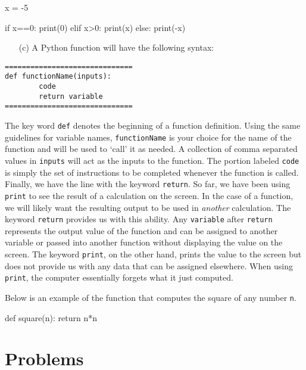 \documentclass{ximera}
\begin{document}
\begin{sageCell}
x = -5
	
if x==0:
        print(0)
elif x>0:
        print(x)
else:
        print(-x)
\end{sageCell}

	\begin{enumerate}
        	\item[(c)] A Python function will have the following syntax:
	\end{enumerate}

\begin{verbatim}
==============================
def functionName(inputs):
        code
        return variable
==============================
\end{verbatim}

The key word \verb|def| denotes the beginning of a function definition. Using the same guidelines for variable names, \verb|functionName| is your choice for the name of the function and will be used to `call' it as needed. A collection of comma separated values in \verb|inputs| will act as the inputs to the function.  The portion labeled \verb|code| is simply the set of instructions to be completed whenever the function is called. Finally, we have the line with the keyword \verb|return|. So far, we have been using \verb|print| to see the result of a calculation on the screen. In the case of a function, we will likely want the resulting output to be used in {\em another} calculation. The keyword \verb|return| provides us with this ability. Any \verb|variable| after \verb|return| represents the output value of the function and can be assigned to another variable or passed into another function without displaying the value on the screen. The keyword \verb|print|, on the other hand, prints the value to the screen but does not provide us with any data that can be assigned elsewhere. When using \verb|print|, the computer essentially forgets what it just computed.

Below is an example of the function that computes the square of any number \verb|n|.

\begin{sageCell}
def square(n):
        return n*n
\end{sageCell}

\section{Problems}
\end{document}
